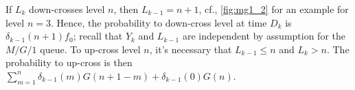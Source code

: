 If $L_{k}$ down-crosses level $n$, then $L_{k-1}=n+1$, cf., \cref{fig:mg1_2} for an example for level $n=3$.
Hence, the probability to down-cross level at time $D_{k}$ is $\delta_{k-1}(n+1) f_{0}$; recall that $Y_{k}$  and $L_{k-1}$ are independent by assumption for the $M/G/1$ queue. To  up-cross level $n$, it's necessary that $L_{k-1}\leq n$ and $L_k>n$.  The probability to up-cross is then $\sum_{m=1}^{n} \delta_{k-1}(m) G(n+1-m) + \delta_{k-1}(0) G(n)$.









